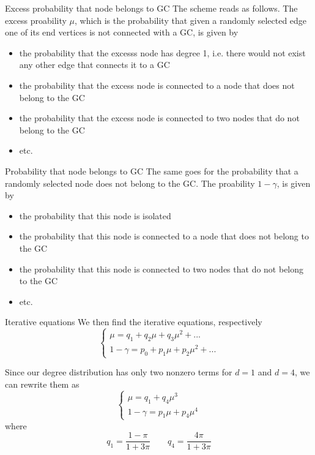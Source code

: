 \documentclass[handout]{beamer}
\begin{document}
\begin{frame}{Excess probability that node belongs to GC}
    The scheme reads as follows. The excess proability $\mu$, which is
    the probability that given a randomly selected edge one of its end vertices
    is not connected with a GC, is given by
    \begin{itemize}
        \item the probability that the excesss node has degree 1, i.e. there
            would not exist any other edge that connects it to a GC
        \item the probability that the excess node is connected to a node that
            does not belong to the GC
        \item the probability that the excess node is connected to two nodes
            that do not belong to the GC
        \item etc.
    \end{itemize}
\end{frame}

\begin{frame}{Probability that node belongs to GC}
    The same goes for the probability that a randomly selected node does not
    belong to the GC. The proability $1-\gamma$, is given by
    \begin{itemize}
        \item the probability that this node is isolated
        \item the probability that this node is connected to a node that does
            not belong to the GC
        \item the probability that this node is connected to two nodes that do
            not belong to the GC
        \item etc.
    \end{itemize}
\end{frame}

\begin{frame}{Iterative equations}
    We then find the iterative equations, respectively
    \begin{equation}
        \begin{cases}
            \mu = q_1 + q_2 \mu + q_3 \mu^2 + ...\\
            1 - \gamma = p_0 + p_1 \mu + p_2 \mu^2 + ...
        \end{cases}
        \label{eq:iterative}
    \end{equation}

    Since our degree distribution has only two nonzero terms for $d=1$ and
    $d=4$, we can rewrite them as
    \begin{equation}
        \begin{cases}
            \mu = q_1 + q_4 \mu^3\\
            1 - \gamma = p_1 \mu + p_4 \mu^4
        \end{cases}
        \label{eq:iterative_cm}
    \end{equation}
    where
    $$
    q_1 = \frac{1-\pi}{1+3\pi} \qquad q_4 = \frac{4\pi}{1+3\pi}
    $$
\end{frame}
\end{document}

